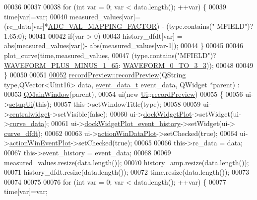 \begin{DoxyCode}
00036 
00037     
00038     \textcolor{keywordflow}{for} (\textcolor{keywordtype}{int} var = 0; var < data.length(); ++var) \{
00039         time[var]=var;
00040         measured\_values[var]=(rc\_data[var]*\hyperlink{a00031_ada92d3eeeec0cbeee41e76a52d145792}{ADC\_VAL\_MAPPING\_FACTOR}) - (type.contains(\textcolor{stringliteral}{"
      MFIELD"})?1.65:0);
00041 
00042         \textcolor{keywordflow}{if}(var > 0)
00043             history\_dfdt[var] = abs(measured\_values[var])- abs(measured\_values[var-1]);
00044     \}
00045 
00046     plot\_curve(time,measured\_values,
00047               (type.contains(\textcolor{stringliteral}{"MFIELD"})?\hyperlink{a00034_a0923d3b365a36e1e8c401cec964aa36f}{WAVEFORM\_PLUS\_MINUS\_1\_65}:
      \hyperlink{a00034_ae18fed2471b16a8516d721ff60671dd9}{WAVEFORM\_0\_TO\_3\_3}));
00048 
00049 \}
00050 
00051 
\hypertarget{a00042_source_l00052}{}\hyperlink{a00020_a3415d6b4da7b24b0bf8674a20f4c65cf}{00052} \hyperlink{a00020_a03ad4ae83a5594f6dc337c7b71873edd}{recordPreview::recordPreview}(QString type,QVector<Uint16> data, 
      \hyperlink{a00003_d0/d89/a00071}{event\_data\_t} event\_data, QWidget *parent) :
00053     \hyperlink{a00010}{QMainWindow}(parent),
00054     ui(new \hyperlink{a00055}{Ui}::\hyperlink{a00020}{recordPreview})
00055 \{
00056     ui->\hyperlink{a00028_afa41dc070a896a5eae476f3c0206825c}{setupUi}(\textcolor{keyword}{this});
00057     this->setWindowTitle(type);
00058 
00059     ui->\hyperlink{a00028_ac9ab4609922159e8e4cc45905f76928e}{centralwidget}->setVisible(\textcolor{keyword}{false});
00060     ui->\hyperlink{a00028_a07b76f17803ec09e0367b72938bbd097}{dockWidgetPlot}->setWidget(ui->\hyperlink{a00028_a247d94481323c0bc4f8b6458a8a535dd}{curve\_data});
00061     ui->\hyperlink{a00028_a2a8f7ee8d4458dd20481c8a1c29ce185}{dockWidgetPlot\_event\_history}->setWidget(ui->
      \hyperlink{a00028_a43d24fa14d90cc27b310542e39dcdd1b}{curve\_dfdt});
00062 
00063     ui->\hyperlink{a00028_aa09067a9c96c9cd78f75261a9fcb89f0}{actionWinDataPlot}->setChecked(\textcolor{keyword}{true});
00064     ui->\hyperlink{a00028_ac72ec9c8679d46fd43a87f99ee6db893}{actionWinEventPlot}->setChecked(\textcolor{keyword}{true});
00065 
00066     this->rc\_data       = data;
00067     this->event\_history  = event\_data;
00068 
00069     measured\_values.resize(data.length());
00070     history\_amp.resize(data.length());
00071     history\_dfdt.resize(data.length());
00072     time.resize(data.length());
00073 
00074 
00075 
00076     \textcolor{keywordflow}{for} (\textcolor{keywordtype}{int} var = 0; var < data.length(); ++var) \{
00077         time[var]=var;

\end{DoxyCode}
